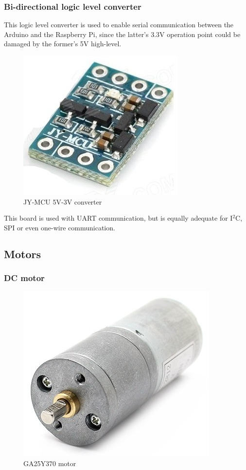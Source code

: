	\subsubsection{Bi-directional logic level converter}

		This logic level converter is used to enable serial communication between the Arduino and the Raspberry Pi, since the latter's 3.3V operation point could be damaged by the former's 5V high-level. 

			\begin{figure}[H]
					\centering
					\includegraphics[scale=0.4]{images/ProjectComponents/logic-voltage.jpg}
					\caption{JY-MCU 5V-3V converter }
					\label{}
			\end{figure}
			\bigskip

		This board is used with UART communication, but is equally adequate for I$^2$C, SPI or even one-wire communication.
 
\subsection{Motors}

	\subsubsection{DC motor}
	
		\begin{figure}[H]
			\centering
			\includegraphics[scale=0.4]{images/ProjectComponents/motor.jpg}
			\caption{GA25Y370 motor }
			\label{}
	\end{figure}
	\bigskip

